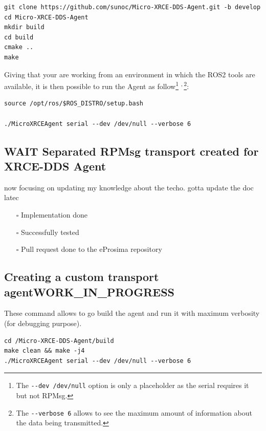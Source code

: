 \documentclass[10pt]{article}
\begin{document}
\begin{verbatim}
git clone https://github.com/sunoc/Micro-XRCE-DDS-Agent.git -b develop
cd Micro-XRCE-DDS-Agent
mkdir build
cd build
cmake ..
make
\end{verbatim}

Giving that your are working from an environment in which the ROS2 tools are available, it is then possible
to run the Agent as follow\footnote{The \texttt{-{}-{}dev /dev/null} option is only a placeholder as the serial requires it but not RPMsg.} \textsuperscript{,}\,\footnote{The \texttt{-{}-{}verbose 6} allows to see the maximum amount of information about the data being transmitted.}:

\begin{verbatim}
source /opt/ros/$ROS_DISTRO/setup.bash

./MicroXRCEAgent serial --dev /dev/null --verbose 6
\end{verbatim}

\subsection{{\bfseries\sffamily WAIT} Separated RPMsg transport created for XRCE-DDS Agent}
\label{sec:org0716039}
now focusing on updating my knowledge about the techo.
  gotta update the doc latec
\begin{itemize}
\item[{$\square$}] Implementation done
\item[{$\square$}] Successfully tested
\item[{$\square$}] Pull request done to the eProsima repository
\end{itemize}

\subsection{Creating a custom transport agent\hfill{}\textsc{WORK\_IN\_PROGRESS}}
\label{sec:orgc98e7ed}
These command allows to go build the agent and run it with maximum verbosity (for debugging purpose).
\begin{verbatim}
cd /Micro-XRCE-DDS-Agent/build
make clean && make -j4
./MicroXRCEAgent serial --dev /dev/null --verbose 6
\end{verbatim}
\end{document}
